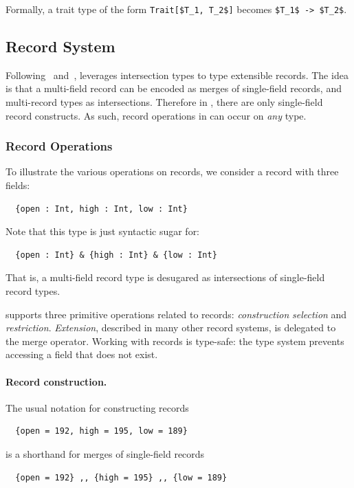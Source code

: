 Formally, a trait type of the form \lstinline[mathescape=true]{Trait[$T_1, T_2$]} becomes \lstinline[mathescape=true]{$T_1$ -> $T_2$}.

\subsection{Record System}

Following~\citet{reynolds1997design} and~\citet{castagna1995calculus}, \name
leverages intersection types to type extensible records. The idea is that a
multi-field record can be encoded as merges of single-field records, and
multi-record types as intersections. Therefore in \name, there are only
single-field record constructs. As such, record operations in \name can occur on
\textit{any} type.

\subsubsection{Record Operations}

To illustrate the various operations on records, we consider a record with three
fields:
\begin{lstlisting}
  {open : Int, high : Int, low : Int}
\end{lstlisting}
Note that this type is just syntactic sugar for:
\begin{lstlisting}
  {open : Int} & {high : Int} & {low : Int}
\end{lstlisting}
That is, a multi-field record type is desugared as intersections of single-field
record types.

\name supports three primitive operations related to records:
\textit{construction} \textit{selection} and \textit{restriction}.
\textit{Extension}, described in many other record systems, is delegated to the
merge operator. Working with records is type-safe: the type system prevents
accessing a field that does not exist.

\paragraph{Record construction.} The usual notation for constructing records
\begin{lstlisting}
  {open = 192, high = 195, low = 189}
\end{lstlisting}
is a shorthand for merges of single-field records
\begin{lstlisting}
  {open = 192} ,, {high = 195} ,, {low = 189}
\end{lstlisting}


